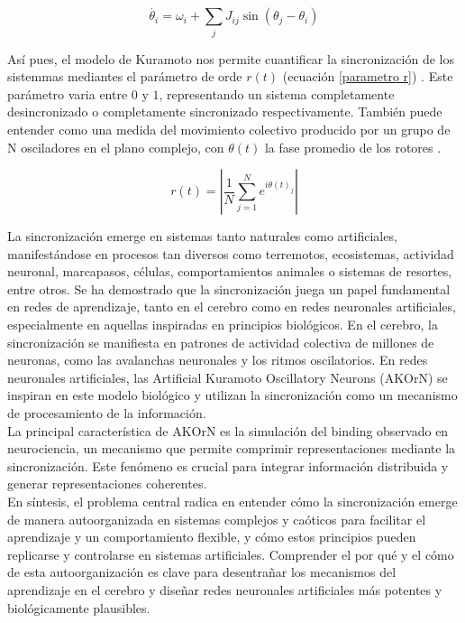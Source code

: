 \documentclass[12pt]{article}
\begin{document}
\begin{equation} 
\dot{\theta_{i}}= \omega_{i} + \sum_jJ_{ij}\sin(\theta_j - \theta_i)
\label{eq:kuramoto}
\end{equation}

Así pues, el modelo de Kuramoto nos permite cuantificar la sincronización de los sistemmas mediantes el parámetro de orde $r(t)$ (ecuación \ref{parametro r}) . Este parámetro varia entre $0$ y $1$, representando un sistema completamente desincronizado o completamente sincronizado respectivamente. También puede entender como una medida del movimiento colectivo producido por un grupo de N osciladores en el plano complejo, con $\theta(t)$ la fase promedio de los rotores .


\begin{equation}
r(t)= \left| \frac{1}{N} \sum _{j=1}^{N} e ^{i\theta(t)_{j}} \right|
    \label{parametro r}
\end{equation}

La sincronización emerge en sistemas tanto naturales como artificiales, manifestándose en procesos tan diversos como terremotos, ecosistemas, actividad neuronal, marcapasos, células, comportamientos animales o sistemas de resortes, entre otros. Se ha demostrado que la sincronización juega un papel fundamental en redes de aprendizaje, tanto en el cerebro como en redes neuronales artificiales, especialmente en aquellas inspiradas en principios biológicos. En el cerebro, la sincronización se manifiesta en patrones de actividad colectiva de millones de neuronas, como las avalanchas neuronales y los ritmos oscilatorios. En redes neuronales artificiales, las Artificial Kuramoto Oscillatory Neurons (AKOrN) se inspiran en este modelo biológico y utilizan la sincronización como un mecanismo de procesamiento de la información. \\

La principal característica de AKOrN es la simulación del binding observado en neurociencia, un mecanismo que permite comprimir representaciones mediante la sincronización. Este fenómeno es crucial para integrar información distribuida y generar representaciones coherentes. \\

En síntesis, el problema central radica en entender cómo la sincronización emerge de manera autoorganizada en sistemas complejos y caóticos para facilitar el aprendizaje y un comportamiento flexible, y cómo estos principios pueden replicarse y controlarse en sistemas artificiales. Comprender el por qué y el cómo de esta autoorganización es clave para desentrañar los mecanismos del aprendizaje en el cerebro y diseñar redes neuronales artificiales más potentes y biológicamente plausibles. \\
\end{document}
